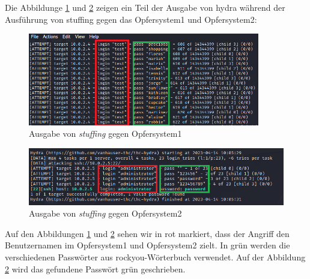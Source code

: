 Die Abbildunge \ref{fig:Ausgabe_Stuffing_Opfer1} und \ref{fig:Ausgabe_Stuffing_Opfer2} zeigen ein Teil der Ausgabe von \gls{hydra} während der Ausführung von \gls{stuffing} gegen das Opfersystem1 und Opfersystem2:
\begin{figure}[H]
   \centering
   \includegraphics[width=0.9\textwidth]{assets/stuffing_kali.png}
   \caption[Ausgabe von \textit{\gls{stuffing}} gegen Opfersystem1]
   {Ausgabe von \textit{\gls{stuffing}} gegen Opfersystem1}
   \label{fig:Ausgabe_Stuffing_Opfer1}
   \centering
\end{figure}

\begin{figure}[H]
   \centering
   \includegraphics[width=1\textwidth]{assets/stuffing_kali2.png}
   \caption[Ausgabe von \textit{\gls{stuffing}} gegen Opfersystem2]
   {Ausgabe von \textit{\gls{stuffing}} gegen Opfersystem2}
   \label{fig:Ausgabe_Stuffing_Opfer2}
   \centering
\end{figure}

Auf den Abbildungen \ref{fig:Ausgabe_Stuffing_Opfer1} und \ref{fig:Ausgabe_Stuffing_Opfer2} sehen wir in rot markiert, dass der Angriff den Benutzernamen  im Opfersystem1 und  Opfersystem2 zielt. In grün werden die verschiedenen Passwörter aus \gls{rockyou}-Wörterbuch verwendet. Auf der Abbildung \ref{fig:Ausgabe_Stuffing_Opfer2} wird das gefundene Passwört grün geschrieben. 

